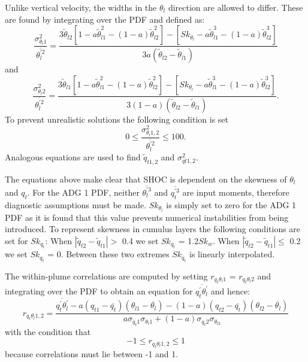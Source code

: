 \documentclass[12pt,titlepage]{article}
\numberwithin{equation}{section}
\begin{document}
Unlike vertical velocity, the widths in the $\theta_{l}$ direction are allowed to differ.  These are found by integrating over the PDF and defined as:
%
\begin{equation}
  \frac{\sigma_{\theta_{l}1}^{2}}{\overline{\theta_{l}^{'2}}}=\frac{3\tilde{\theta}_{l2}[1-a\tilde{\theta}_{l1}^{2}-(1-a)\tilde{\theta}_{l2}^{2}]-[Sk_{\theta_{l}}-a\tilde{\theta}_{l1}^{3}-(1-a)\tilde{\theta}_{l2}^{3}]}{3a(\tilde{\theta}_{l2}-\tilde{\theta}_{l1})}
  \label{sig_thl1}
\end{equation}
%
and
%
\begin{equation}
    \frac{\sigma_{\theta_{l}2}^{2}}{\overline{\theta_{l}^{'2}}}=\frac{3\tilde{\theta}_{l1}[1-a\tilde{\theta}_{l1}^{2}-(1-a)\tilde{\theta}_{l2}^{2}]-[Sk_{\theta_{l}}-a\tilde{\theta}_{l1}^{3}-(1-a)\tilde{\theta}_{l2}^{3}]}{3(1-a)(\tilde{\theta}_{l2}-\tilde{\theta}_{l1})}.
  \label{sig_thl2}
\end{equation}
%
To prevent unrealistic solutions the following condition is set
%
\begin{equation}
  0 \le \frac{\sigma_{\theta_{l}1,2}^{2}}{\overline{\theta_{l}^{'2}}} \le 100.
  \label{cond}
\end{equation}
%  
Analogous equations are used to find $\tilde{q}_{t1,2}$ and $\sigma_{qt1,2}^{2}$.  

The equations above make clear that SHOC is dependent on the skewness of $\theta_{l}$ and $q_{t}$.  For the ADG 1 PDF, neither $\overline{\theta_{l}^{'3}}$ and $\overline{q_{t}^{'3}}$ are input moments, therefore diagnostic assumptions must be made.  $Sk_{\theta_{l}}$ is simply set to zero for the ADG 1 PDF as it is found that this value prevents numerical instabilities from being introduced.  To represent skewness in cumulus layers the following conditions are set for $Sk_{q_{t}}$:  When $|\tilde{q}_{t2}-\tilde{q}_{t1}| >$ 0.4 we set $Sk_{q_{t}}$ = 1.2$Sk_{w}$.  When $|\tilde{q}_{t2}-\tilde{q}_{t1}| \le$ 0.2 we set $Sk_{q_{t}}$ = 0.  Between these two extremes $Sk_{q_{t}}$ is linearly interpolated.    

The within-plume correlations are computed by setting $r_{q_{t}\theta_{l}1}$ = $r_{q_{t}\theta_{l}2}$ and integrating over the PDF to obtain an equation for $\overline{q_{t}^{'}\theta_{l}^{'}}$ and hence: 
%
\begin{equation}
  r_{q_{t}\theta_{l}1,2}=\frac{\overline{q_{t}^{'}\theta_{l}^{'}}-a(q_{t1}-\overline{q_{t}})(\theta_{l1}-\overline{\theta_{l}})-(1-a)(q_{t2}-\overline{q_{t}})(\theta_{l2}-\overline{\theta_{l}})}{a\sigma_{q_{t}1}\sigma_{\theta_{l}1}+(1-a)\sigma_{q_{t}2}\sigma_{\theta_{l2}}}
 \label{corr_eq}
\end{equation}
% 
with the condition that
%
\begin{equation}
-1 \le  r_{q_{t}\theta_{l}1,2} \le 1
\end{equation}
%
because correlations must lie between -1 and 1.  
\end{document}
